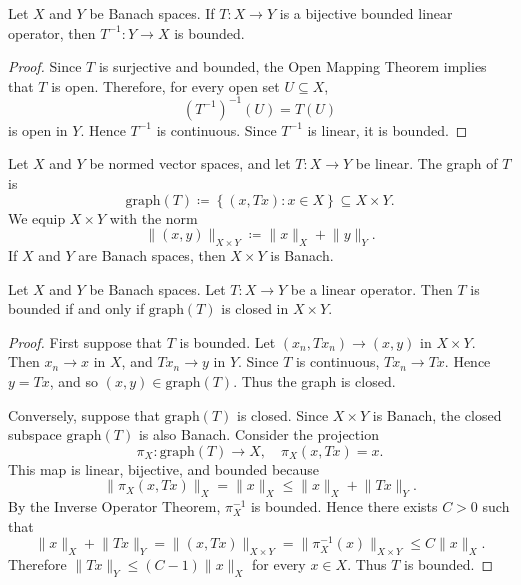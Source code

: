 \begin{theorem} \label{thm: inverse operator theorem}
    Let \(X\) and \(Y\) be Banach spaces. If \(T : X \to Y\) is a bijective bounded linear operator, then \(T^{-1} : Y \to X\) is bounded.
\end{theorem}

\begin{proof}
    Since \(T\) is surjective and bounded, the Open Mapping Theorem implies that \(T\) is open. Therefore, for every open set \(U \subseteq X\),
    \[
        (T^{-1})^{-1}(U) = T(U)
    \]
    is open in \(Y\). Hence \(T^{-1}\) is continuous. Since \(T^{-1}\) is linear, it is bounded.
\end{proof}

\begin{definition}
    Let \(X\) and \(Y\) be normed vector spaces, and let \(T : X \to Y\) be linear. The graph of \(T\) is
    \[
        \mathrm{graph}(T) \coloneqq \left\{ (x, Tx) : x \in X \right\} \subseteq X \times Y.
    \]
    We equip \(X \times Y\) with the norm
    \[
        \lVert (x, y) \rVert_{X \times Y} \coloneqq \lVert x \rVert_X + \lVert y \rVert_Y.
    \]
    If \(X\) and \(Y\) are Banach spaces, then \(X \times Y\) is Banach.
\end{definition}

\begin{theorem} \label{thm: closed graph theorem}
    Let \(X\) and \(Y\) be Banach spaces. Let \(T : X \to Y\) be a linear operator. Then \(T\) is bounded if and only if \(\mathrm{graph}(T)\) is closed in \(X \times Y\).
\end{theorem}

\begin{proof}
    First suppose that \(T\) is bounded. Let \((x_n, Tx_n) \to (x, y)\) in \(X \times Y\). Then \(x_n \to x\) in \(X\), and \(Tx_n \to y\) in \(Y\). Since \(T\) is continuous, \(Tx_n \to Tx\). Hence \(y = Tx\), and so \((x, y) \in \mathrm{graph}(T)\). Thus the graph is closed.

    Conversely, suppose that \(\mathrm{graph}(T)\) is closed. Since \(X \times Y\) is Banach, the closed subspace \(\mathrm{graph}(T)\) is also Banach. Consider the projection
    \[
        \pi_X : \mathrm{graph}(T) \to X, \quad \pi_X(x, Tx) = x.
    \]
    This map is linear, bijective, and bounded because
    \[
        \lVert \pi_X(x, Tx) \rVert_X = \lVert x \rVert_X \leq \lVert x \rVert_X + \lVert Tx \rVert_Y.
    \]
    By the Inverse Operator Theorem, \(\pi_X^{-1}\) is bounded. Hence there exists \(C > 0\) such that
    \[
        \lVert x \rVert_X + \lVert Tx \rVert_Y   = \lVert (x, Tx) \rVert_{X \times Y} = \lVert \pi_X^{-1} (x) \rVert_{X \times Y} \leq C \lVert x \rVert_X.
    \]
    Therefore \(\lVert Tx \rVert_Y \leq (C - 1) \lVert x \rVert_X\) for every \(x \in X\). Thus \(T\) is bounded.
\end{proof}

